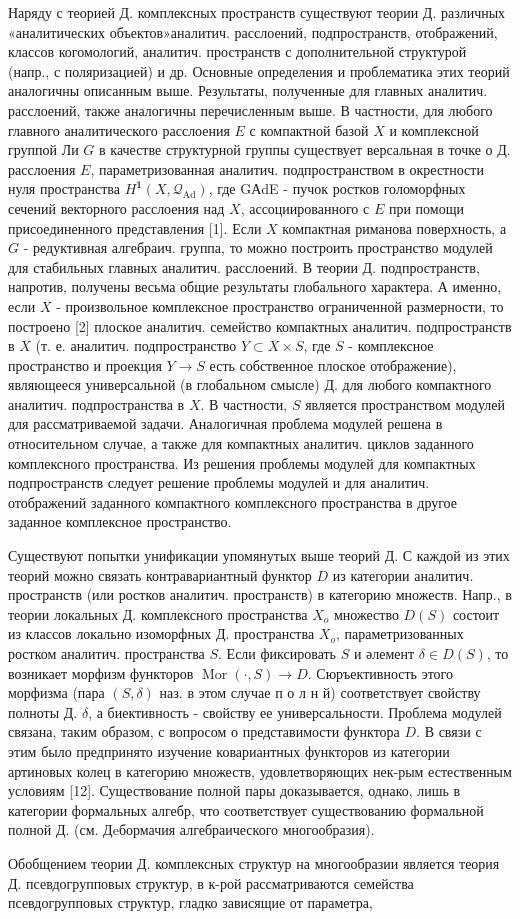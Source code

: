 \documentclass[10pt]{article}
\begin{document}
Наряду с теорией Д. комплексных пространств существуют теории Д. различных «аналитических объектов»аналитич. расслоений, подпространств, отображений, классов когомологий, аналитич. пространств с дополнительной структурой (напр., с поляризацией) и др. Основные определения и проблематика этих теорий аналогичны описанным выше. Результаты, полученные для главных аналитич. расслоений, также аналогичны перечисленным выше. В частности, для любого главного аналитического расслоения $E$ с компактной базой $X$ и комплексной группой Ли $G$ в качестве структурной группы существует версальная в точке $о$ Д. расслоения $E$, параметризованная аналитич. подпространством в окрестности нуля пространства $H^{\mathbf{1}}\left(X, \mathcal{Q}_{\mathrm{Ad}}\right)$, где GАdE - пучок ростков голоморфных сечений векторного расслоения над $X$, ассоциированного с $E$ при помощи присоединенного представления [1]. Если $X$ компактная риманова поверхность, а $G$ - редуктивная алгебраич. группа, то можно построить пространство модулей для стабильных главных аналитич. расслоений. В теории Д. подпространств, напротив, получены весьма общие результаты глобального характера. А именно, если $X$ - произвольное комплексное пространство ограниченной размерности, то построено [2] плоское аналитич. семейство компактных аналитич. подпространств в $X$ (т. е. аналитич. подпространство $Y \subset X \times S$, где $S$ - комплексное пространство и проекция $Y \rightarrow S$ есть собственное плоское отображение), являющееся универсальной (в глобальном смысле) Д. для любого компактного аналитич. подпространства в $X$. В частности, $S$ является пространством модулей для рассматриваемой задачи. Аналогичная проблема модулей решена в относительном случае, а также для компактных аналитич. циклов заданного комплексного пространства. Из решения проблемы модулей для компактных подпространств следует решение проблемы модулей и для аналитич. отображений заданного компактного комплексного пространства в другое заданное комплексное пространство.



Существуют попытки унификации упомянутых выше теорий Д. С каждой из этих теорий можно связать контравариантный функтор $D$ из категории аналитич. пространств (или ростков аналитич. пространств) в категорию множеств. Напр., в теории локальных Д. комплексного пространства $X_{o}$ множество $D(S)$ состоит из классов локально изоморфных Д. пространства $X_{o}$, параметризованных ростком аналитич. пространства $S$. Если фиксировать $S$ и әлемент $\delta \in D(S)$, то возникает морфизм функторов $\operatorname{Mor}(\cdot, S) \rightarrow D$. Сюръективность этого морфизма (пара $(S, \delta)$ наз. в этом случае п о л н й) соответствует свойству полноты Д. $\delta$, а биективность - свойству ее универсальности. Проблема модулей связана, таким образом, с вопросом о представимости функтора $D$. В связи с этим было предпринято изучение ковариантных функторов из категории артиновых колец в категорию множеств, удовлетворяющих нек-рым естественным условиям [12]. Существование полной пары доказывается, однако, лишь в категории формальных алгебр, что соответствует существованию формальной полной Д. (см. Дeбормачия алгебраического многообразия).



Обобщением теории Д. комплексных структур на многообразии является теория Д. псевдогрупповых структур, в к-рой рассматриваются семейства псевдогрупповых структур, гладко зависящие от параметра,
\end{document}
